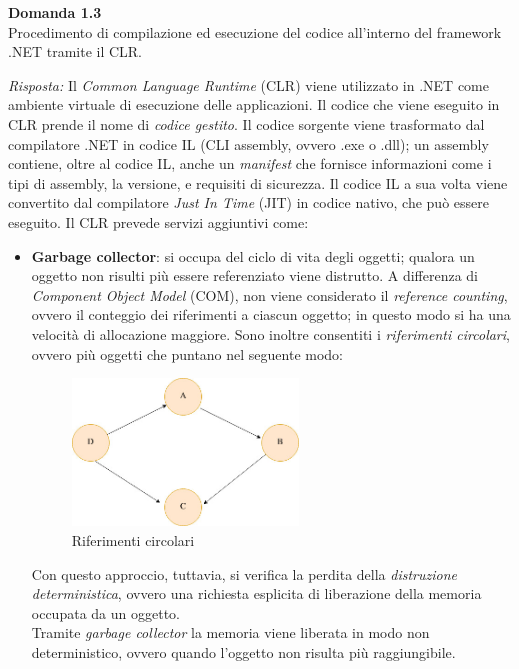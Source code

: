 \documentclass{article}
\newenvironment{problem}[2][Domanda]
    { \begin{mdframed}[backgroundcolor=gray!20] \textbf{#1 #2} \\}
    {  \end{mdframed}}
\newenvironment{solution}
    {\textit{Risposta:}}
    {}
\begin{document}
\begin{problem}{1.3}
Procedimento di compilazione ed esecuzione del codice all'interno del framework .NET tramite il CLR.
\end{problem}
\begin{solution}
Il \textit{Common Language Runtime} (CLR) viene utilizzato in .NET come ambiente virtuale di esecuzione delle applicazioni.
Il codice che viene eseguito in CLR prende il nome di \textit{codice gestito}.
\newline
Il codice sorgente viene trasformato dal compilatore .NET in codice IL (CLI assembly, ovvero .exe o .dll); un assembly contiene, oltre al codice IL, anche un \textit{manifest} che fornisce informazioni come i tipi di assembly, la versione, e requisiti di sicurezza.
Il codice IL a sua volta viene convertito dal compilatore \textit{Just In Time} (JIT) in codice nativo, che può essere eseguito.
\newline
Il CLR prevede servizi aggiuntivi come:
\begin{itemize}
	\item \textbf{Garbage collector}: si occupa del ciclo di vita degli oggetti; qualora un oggetto non risulti più essere referenziato viene distrutto.
	\newline
	A differenza di \textit{Component Object Model} (COM), non viene considerato il \textit{reference counting}, ovvero il conteggio dei riferimenti a ciascun oggetto; in questo modo si ha una velocità di allocazione maggiore.
	\newline
	Sono inoltre consentiti i \textit{riferimenti circolari}, ovvero più oggetti che puntano nel seguente modo:
	\begin{figure}[h]
	\centering
	\includegraphics[width=6cm]{./immagini/riferimentiCircolari.jpg}
	\caption{Riferimenti circolari}
\end{figure}
	Con questo approccio, tuttavia, si verifica la perdita della \textit{distruzione deterministica}, ovvero una richiesta esplicita di liberazione della memoria occupata da un oggetto.
	\\Tramite \textit{garbage collector} la memoria viene liberata in modo non deterministico, ovvero quando l'oggetto non risulta più raggiungibile.

\end{itemize}
\end{solution}
\end{document}
